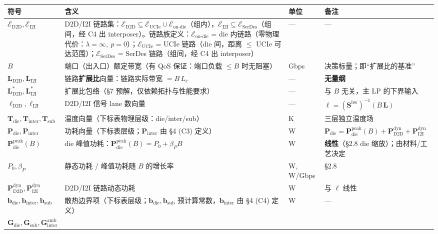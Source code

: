 \documentclass[11pt]{article}
\newcommand{\bv}{\mathbf}
\newcommand{\E}{\mathcal{E}}
\begin{document}
\begin{longtable}{@{}p{4.0cm}p{7.6cm}p{1.4cm}p{3.5cm}@{}}
\toprule
符号 & 含义 & 单位 & 备注 \\
\midrule
\endhead
$\E_{\text{D2D}}, \E_{\text{I2I}}$ &
D2D/I2I 链路集：$\E_{\text{D2D}} \subseteq \E_{\text{UCIe}} \cup \E_{\text{on-die}}$（组内），$\E_{\text{I2I}} \subseteq \E_{\text{SerDes}}$（组间，经 C4 出 interposer）。链路族定义：$\E_{\text{on-die}}$ = die 内链路（零物理代价：$\lambda=\infty,\ p=0$）；$\E_{\text{UCIe}}$ = UCIe 链路（die 间，距离 $\le$ UCIe 可达范围）；$\E_{\text{SerDes}}$ = SerDes 链路（组间，经 C4 出 interposer） & — & — \\
$B$ &
端口（出入口）额定带宽（有 QoS 保证：端口负载 $\le B$ 时无阻塞） & Gbps & 决策标量；即“扩展比的基准” \\
$\bv{L}_{\text{D2D}}, \bv{L}_{\text{I2I}}$ &
链路\textbf{扩展比}向量：链路实际带宽 $= B\,L_e$ & — & \textbf{无量纲} \\
$\bv{L}_{\text{D2D}}^{*}, \bv{L}_{\text{I2I}}^{*}$ &
扩展比包络（§7 预解，仅依赖拓扑与性能要求） & — & 与 $B$ 无关，主 LP 的下界输入 \\
$\boldsymbol{\ell}_{\text{D2D}}, \boldsymbol{\ell}_{\text{I2I}}$ &
D2D/I2I 信号 lane 数向量 & — & $\boldsymbol{\ell} = \left(\bv{S}^{\text{bw}}\right)^{-1}(B\,\bv{L})$ \\
$\bv{T}_{\text{die}}, \bv{T}_{\text{inter}}, \bv{T}_{\text{sub}}$ &
温度向量（下标表物理层级：die/inter/sub） & K & 三层独立温度场 \\
$\bv{P}_{\text{die}}, \bv{P}_{\text{inter}}$ &
功耗向量（下标表层级；$\bv{P}_{\text{inter}}$ 由 §4 (C3) 定义） & W & $\bv{P}_{\text{die}} = \bv{P}_{\text{die}}^{\text{peak}}(B) + \bv{P}_{\text{D2D}}^{\text{dyn}} + \bv{P}_{\text{I2I}}^{\text{dyn}}$ \\
$\bv{P}_{\text{die}}^{\text{peak}}(B)$ &
die 峰值功耗：$\bv{P}_{\text{die}}^{\text{peak}}(B) = P_0 + \beta_P B$ & W & \textbf{线性}（§2.8 die 缩放）；由材料/工艺决定 \\
$P_0, \beta_P$ &
静态功耗 / 峰值功耗随 $B$ 的增长率 & W, W/Gbps & §2.8 \\
$\bv{P}_{\text{D2D}}^{\text{dyn}}, \bv{P}_{\text{I2I}}^{\text{dyn}}$ &
D2D/I2I 链路动态功耗 & W & 与 $\boldsymbol{\ell}$ 线性 \\
$\bv{b}_{\text{die}}, \bv{b}_{\text{inter}}, \bv{b}_{\text{sub}}$ &
散热边界项（下标表层级；$\bv{b}_{\text{die}}, \bv{b}_{\text{sub}}$ 预计算常数，$\bv{b}_{\text{inter}}$ 由 §4 (C4) 定义） & W & — \\
$\bv{G}_{\text{die}}, \bv{G}_{\text{sub}}, \bv{G}_{\text{inter}}^{\text{amb}}$ &

\end{longtable}
\end{document}
